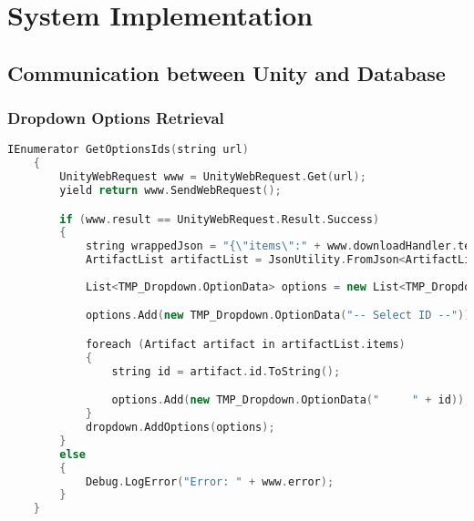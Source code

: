 \section{System Implementation}

\subsection{Communication between Unity and Database}

\subsubsection{Dropdown Options Retrieval}

\begin{lstlisting}[language=C++, caption={Method used to load artifact IDs and define as options in the Dropdown.}, label={lst:artifact_ids}]
      IEnumerator GetOptionsIds(string url)
    {
        UnityWebRequest www = UnityWebRequest.Get(url);
        yield return www.SendWebRequest();

        if (www.result == UnityWebRequest.Result.Success)
        {
            string wrappedJson = "{\"items\":" + www.downloadHandler.text + "}";
            ArtifactList artifactList = JsonUtility.FromJson<ArtifactList>(wrappedJson);
            
            List<TMP_Dropdown.OptionData> options = new List<TMP_Dropdown.OptionData>();

            options.Add(new TMP_Dropdown.OptionData("-- Select ID --"));

            foreach (Artifact artifact in artifactList.items)
            {
                string id = artifact.id.ToString();

                options.Add(new TMP_Dropdown.OptionData("     " + id));
            }
            dropdown.AddOptions(options);
        }
        else
        {
            Debug.LogError("Error: " + www.error);
        }
    }
\end{lstlisting}
